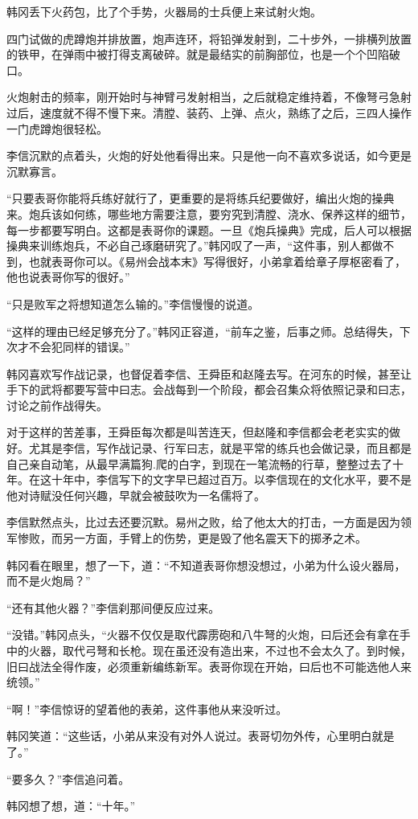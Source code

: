 韩冈丢下火药包，比了个手势，火器局的士兵便上来试射火炮。

四门试做的虎蹲炮并排放置，炮声连环，将铅弹发射到，二十步外，一排横列放置的铁甲，在弹雨中被打得支离破碎。就是最结实的前胸部位，也是一个个凹陷破口。

火炮射击的频率，刚开始时与神臂弓发射相当，之后就稳定维持着，不像弩弓急射过后，速度就不得不慢下来。清膛、装药、上弹、点火，熟练了之后，三四人操作一门虎蹲炮很轻松。

李信沉默的点着头，火炮的好处他看得出来。只是他一向不喜欢多说话，如今更是沉默寡言。

“只要表哥你能将兵练好就行了，更重要的是将练兵纪要做好，编出火炮的操典来。炮兵该如何练，哪些地方需要注意，要穷究到清膛、浇水、保养这样的细节，每一步都要写明白。这都是表哥你的课题。一旦《炮兵操典》完成，后人可以根据操典来训练炮兵，不必自己琢磨研究了。”韩冈叹了一声，“这件事，别人都做不到，也就表哥你可以。《易州会战本末》写得很好，小弟拿着给章子厚枢密看了，他也说表哥你写的很好。”

“只是败军之将想知道怎么输的。”李信慢慢的说道。

“这样的理由已经足够充分了。”韩冈正容道，“前车之鉴，后事之师。总结得失，下次才不会犯同样的错误。”

韩冈喜欢写作战记录，也督促着李信、王舜臣和赵隆去写。在河东的时候，甚至让手下的武将都要写营中曰志。会战每到一个阶段，都会召集众将依照记录和曰志，讨论之前作战得失。

对于这样的苦差事，王舜臣每次都是叫苦连天，但赵隆和李信都会老老实实的做好。尤其是李信，写作战记录、行军曰志，就是平常的练兵也会做记录，而且都是自己亲自动笔，从最早满篇狗.爬的白字，到现在一笔流畅的行草，整整过去了十年。在这十年中，李信写下的文字早已超过百万。以李信现在的文化水平，要不是他对诗赋没任何兴趣，早就会被鼓吹为一名儒将了。

李信默然点头，比过去还要沉默。易州之败，给了他太大的打击，一方面是因为领军惨败，而另一方面，手臂上的伤势，更是毁了他名震天下的掷矛之术。

韩冈看在眼里，想了一下，道：“不知道表哥你想没想过，小弟为什么设火器局，而不是火炮局？”

“还有其他火器？”李信刹那间便反应过来。

“没错。”韩冈点头，“火器不仅仅是取代霹雳砲和八牛弩的火炮，曰后还会有拿在手中的火器，取代弓弩和长枪。现在虽还没有造出来，不过也不会太久了。到时候，旧曰战法全得作废，必须重新编练新军。表哥你现在开始，曰后也不可能选他人来统领。”

“啊！”李信惊讶的望着他的表弟，这件事他从来没听过。

韩冈笑道：“这些话，小弟从来没有对外人说过。表哥切勿外传，心里明白就是了。”

“要多久？”李信追问着。

韩冈想了想，道：“十年。”

